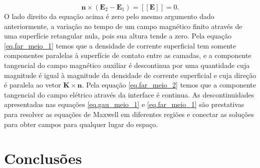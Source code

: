 \begin{equation}\label{eq.far_meio_2}
\mathbf{n}\times(\mathbf{E}_2-\mathbf{E}_1)=\left[\left[\mathbf{E}\right]\right]=0.
\end{equation}
O lado direito da equa\c{c}\~ao acima \'e zero pelo mesmo argumento dado anteriormente, a varia\c{c}\~ao no tempo de um campo magn\'etico finito atrav\'es de uma superf\'icie retangular nula, pois sua altura tende a zero.
Pela equa\c{c}\~ao \ref{eq.far_meio_1} temos que a densidade de corrente superficial tem somente componentes paralelas \`a superf\'icie de contato entre as camadas, e a componente tangencial do campo magn\'etico auxiliar \'e descontinua por uma quantidade cuja magnitude \'e igual \`a magnitude da densidade de corrente superficial e cuja dire\c{c}\~ao \'e paralela ao vetor $\mathbf{K}\times\mathbf{n}$. Pela equa\c{c}\~ao \ref{eq.far_meio_2} temos que a componente tangencial do campo el\'etrico atrav\'es da interface \'e continua. As descontinuidades apresentadas nas equa\c{c}\~oes \ref{eq.gau_meio_1} e \ref{eq.far_meio_1} s\~ao prestativas para resolver as equa\c{c}\~oes de Maxwell em diferentes regi\~oes e conectar as solu\c{c}\~oes para obter campos para qualquer lugar do espa\c{c}o.  





\section{Conclusões}